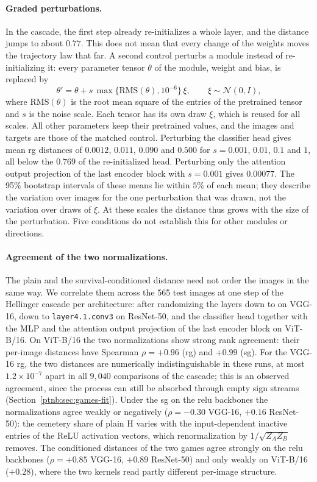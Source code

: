 \paragraph{Graded perturbations.}
In the cascade, the first step already re-initializes a whole layer, and the distance jumps to about $0.77$. This does not mean that every change of the weights moves the trajectory law that far. A second control perturbs a module instead of re-initializing it: every parameter tensor $\theta$ of the module, weight and bias, is replaced by
\[
 \theta'=\theta+s\,\max\{\mathrm{RMS}(\theta),10^{-6}\}\,\xi,\qquad \xi\sim\mathcal N(0,I),
\]
where $\mathrm{RMS}(\theta)$ is the root mean square of the entries of the pretrained tensor and $s$ is the noise scale. Each tensor has its own draw $\xi$, which is reused for all scales. All other parameters keep their pretrained values, and the images and targets are those of the matched control. Perturbing the classifier head gives mean \ac{rg} distances of $0.0012$, $0.011$, $0.090$ and $0.500$ for $s=0.001$, $0.01$, $0.1$ and $1$, all below the $0.769$ of the re-initialized head. Perturbing only the attention output projection of the last encoder block with $s=0.001$ gives $0.00077$. The 95\% bootstrap intervals of these means lie within $5\%$ of each mean; they describe the variation over images for the one perturbation that was drawn, not the variation over draws of $\xi$. At these scales the distance thus grows with the size of the perturbation. Five conditions do not establish this for other modules or directions.

\paragraph{Agreement of the two normalizations.}
The plain and the survival-conditioned distance need not order the images in the same way. We correlate them across the 565 test images at one step of the Hellinger cascade per architecture: after randomizing the layers down to  on VGG-16, down to \mbox{\texttt{layer4.1.conv3}} on ResNet-50, and the classifier head together with the MLP and the attention output projection of the last encoder block on ViT-B/16. On ViT-B/16 the two normalizations show strong rank agreement: their per-image distances have Spearman $\rho=+0.96$ (\ac{rg}) and $+0.99$ (\ac{sg}). For the VGG-16 \ac{rg}, the two distances are numerically indistinguishable in these runs, at most $1.2\times10^{-7}$ apart in all $9{,}040$ comparisons of the cascade; this is an observed agreement, since the process can still be absorbed through empty sign streams (Section~\ref{ptnb:sec:games-fit}). Under the \ac{sg} on the \ac{relu} backbones the normalizations agree weakly or negatively ($\rho=-0.30$ VGG-16, $+0.16$ ResNet-50): the cemetery share of plain $\mathrm{H}$ varies with the input-dependent inactive entries of the ReLU activation vectors, which renormalization by $1/\sqrt{Z_A Z_B}$ removes. The conditioned distances of the two games agree strongly on the \ac{relu} backbones ($\rho=+0.85$ VGG-16, $+0.89$ ResNet-50) and only weakly on ViT-B/16 ($+0.28$), where the two kernels read partly different per-image structure.

